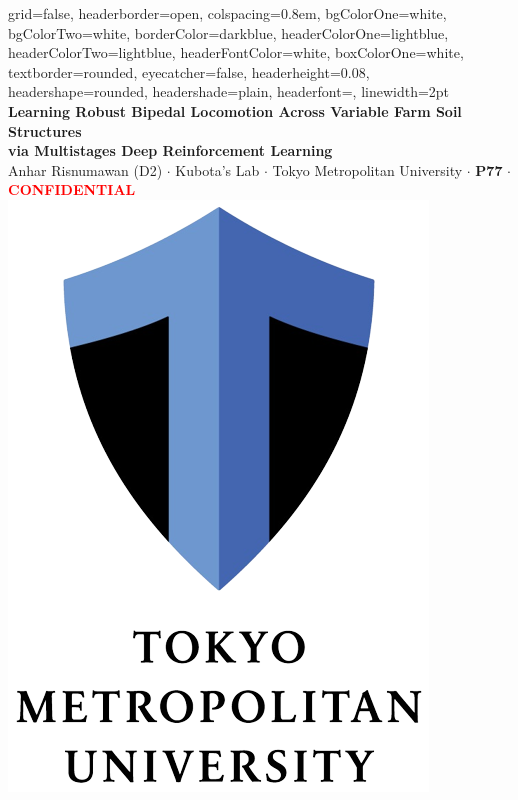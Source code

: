 \documentclass[a1paper,portrait,fontscale=0.5]{baposter}
\begin{document}

\begin{poster}
{
grid=false,
headerborder=open,
colspacing=0.8em,
bgColorOne=white,
bgColorTwo=white,
borderColor=darkblue,
headerColorOne=lightblue,
headerColorTwo=lightblue,
headerFontColor=white,
boxColorOne=white,
textborder=rounded,
eyecatcher=false,
headerheight=0.08\textheight,
headershape=rounded,
headershade=plain,
headerfont=\large\textsf,
linewidth=2pt
}
{}
%
%
{\sffamily\huge\bfseries
Learning Robust Bipedal Locomotion Across Variable Farm Soil Structures \\
via Multistages Deep Reinforcement Learning
} %
{\sf\vspace{0.2em}\\
\Large Anhar Risnumawan (D2) $\cdot$ Kubota's Lab $\cdot$ Tokyo Metropolitan University $\cdot$ \textbf{P77} $\cdot$ \textbf{\textcolor{red}{CONFIDENTIAL}}} %
{\includegraphics{university_logo}} %


\end{poster}
\end{document}

